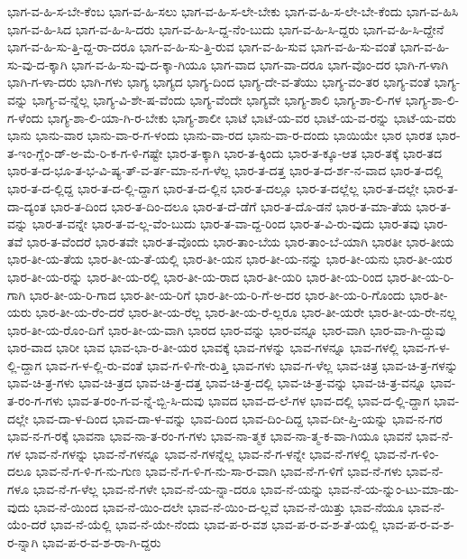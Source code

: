 {ಭಾಗ-ವ-ಹಿ-ಸ-ಬೇ-ಕೆಂಬ
ಭಾಗ-ವ-ಹಿ-ಸಲು
ಭಾಗ-ವ-ಹಿ-ಸ-ಲೇ-ಬೇಕು
ಭಾಗ-ವ-ಹಿ-ಸ-ಲೇ-ಬೇ-ಕೆಂದು
ಭಾಗ-ವ-ಹಿಸಿ
ಭಾಗ-ವ-ಹಿ-ಸಿದ
ಭಾಗ-ವ-ಹಿ-ಸಿ-ದರು
ಭಾಗ-ವ-ಹಿ-ಸಿ-ದ್ದ-ನೆಂ-ಬುದು
ಭಾಗ-ವ-ಹಿ-ಸಿ-ದ್ದರು
ಭಾಗ-ವ-ಹಿ-ಸಿ-ದ್ದೇನೆ
ಭಾಗ-ವ-ಹಿ-ಸು-ತ್ತಿ-ದ್ದ-ರಾ-ದರೂ
ಭಾಗ-ವ-ಹಿ-ಸು-ತ್ತಿ-ರುವ
ಭಾಗ-ವ-ಹಿ-ಸುವ
ಭಾಗ-ವ-ಹಿ-ಸು-ವಂತೆ
ಭಾಗ-ವ-ಹಿ-ಸು-ವು-ದ-ಕ್ಕಾಗಿ
ಭಾಗ-ವ-ಹಿ-ಸು-ವು-ದ-ಕ್ಕಾ-ಗಿಯೂ
ಭಾಗ-ವಾದ
ಭಾಗ-ವಾ-ದರೂ
ಭಾಗ-ವೊಂ-ದರ
ಭಾಗಿ-ಗ-ಳಾಗಿ
ಭಾಗಿ-ಗ-ಳಾ-ದರು
ಭಾಗಿ-ಗಳು
ಭಾಗ್ಯ
ಭಾಗ್ಯದ
ಭಾಗ್ಯ-ದಿಂದ
ಭಾಗ್ಯ-ದೇ-ವ-ತೆಯು
ಭಾಗ್ಯ-ವಂ-ತರ
ಭಾಗ್ಯ-ವಂತೆ
ಭಾಗ್ಯ-ವನ್ನು
ಭಾಗ್ಯ-ವ-ನ್ನೆಲ್ಲ
ಭಾಗ್ಯ-ವಿ-ಶೇ-ಷ-ವೆಂದು
ಭಾಗ್ಯ-ವೆಂದೇ
ಭಾಗ್ಯವೇ
ಭಾಗ್ಯ-ಶಾಲಿ
ಭಾಗ್ಯ-ಶಾ-ಲಿ-ಗಳ
ಭಾಗ್ಯ-ಶಾ-ಲಿ-ಗ-ಳೆಂದು
ಭಾಗ್ಯ-ಶಾ-ಲಿ-ಯಾ-ಗಿ-ರ-ಬೇಕು
ಭಾಗ್ಯ-ಶಾಲೀ
ಭಾಟೆ
ಭಾಟೆ-ಯ-ವರ
ಭಾಟೆ-ಯ-ವ-ರನ್ನು
ಭಾಟೆ-ಯ-ವರು
ಭಾನು
ಭಾನು-ವಾರ
ಭಾನು-ವಾ-ರ-ಗ-ಳಂದು
ಭಾನು-ವಾ-ರದ
ಭಾನು-ವಾ-ರ-ದಂದು
ಭಾಯಿಯೇ
ಭಾರ
ಭಾರತ
ಭಾರ-ತ-ಇಂ-ಗ್ಲೆಂ-ಡ್-ಅ-ಮೆ-ರಿ-ಕ-ಗ-ಳಿ-ಗಷ್ಟೇ
ಭಾರ-ತ-ಕ್ಕಾಗಿ
ಭಾರ-ತ-ಕ್ಕಿಂದು
ಭಾರ-ತ-ಕ್ಕೂ-ಆತ
ಭಾರ-ತಕ್ಕೆ
ಭಾರ-ತದ
ಭಾರ-ತ-ದ-ಭೂ-ತ-ಭ-ವಿ-ಷ್ಯ-ತ್-ವ-ರ್ತ-ಮಾ-ನ-ಗ-ಳೆಲ್ಲ
ಭಾರ-ತ-ದತ್ತ
ಭಾರ-ತ-ದ-ರ್ಶ-ನ-ವಾದ
ಭಾರ-ತ-ದಲ್ಲಿ
ಭಾರ-ತ-ದ-ಲ್ಲಿದ್ದ
ಭಾರ-ತ-ದ-ಲ್ಲಿ-ದ್ದಾಗ
ಭಾರ-ತ-ದ-ಲ್ಲಿನ
ಭಾರ-ತ-ದಲ್ಲೂ
ಭಾರ-ತ-ದಲ್ಲೆಲ್ಲ
ಭಾರ-ತ-ದಲ್ಲೇ
ಭಾರ-ತ-ದಾ-ದ್ಯಂತ
ಭಾರ-ತ-ದಿಂದ
ಭಾರ-ತ-ದಿಂ-ದಲೂ
ಭಾರ-ತ-ದೆ-ಡೆಗೆ
ಭಾರ-ತ-ದೊ-ಡನೆ
ಭಾರ-ತ-ಮಾ-ತೆಯ
ಭಾರ-ತ-ವನ್ನು
ಭಾರ-ತ-ವನ್ನೇ
ಭಾರ-ತ-ವ-ಲ್ಲ-ವೆಂ-ಬುದು
ಭಾರ-ತ-ವಾ-ದ್ದ-ರಿಂದ
ಭಾರ-ತ-ವಿ-ರು-ವುದು
ಭಾರ-ತವು
ಭಾರ-ತವೆ
ಭಾರ-ತ-ವೆಂದರೆ
ಭಾರ-ತವೇ
ಭಾರ-ತ-ವೊಂದು
ಭಾರ-ತಾಂ-ಬೆಯ
ಭಾರ-ತಾಂ-ಬೆ-ಯಾಗಿ
ಭಾರತೀ
ಭಾರ-ತೀಯ
ಭಾರ-ತೀ-ಯ-ತೆಯ
ಭಾರ-ತೀ-ಯ-ತೆ-ಯಲ್ಲಿ
ಭಾರ-ತೀ-ಯನ
ಭಾರ-ತೀ-ಯ-ನನ್ನು
ಭಾರ-ತೀ-ಯನು
ಭಾರ-ತೀ-ಯರ
ಭಾರ-ತೀ-ಯ-ರನ್ನು
ಭಾರ-ತೀ-ಯ-ರಲ್ಲಿ
ಭಾರ-ತೀ-ಯ-ರಾದ
ಭಾರ-ತೀ-ಯರಿ
ಭಾರ-ತೀ-ಯ-ರಿಂದ
ಭಾರ-ತೀ-ಯ-ರಿ-ಗಾಗಿ
ಭಾರ-ತೀ-ಯ-ರಿ-ಗಾದ
ಭಾರ-ತೀ-ಯ-ರಿಗೆ
ಭಾರ-ತೀ-ಯ-ರಿ-ಗೆ-ಅ-ದರ
ಭಾರ-ತೀ-ಯ-ರಿ-ಗೊಂದು
ಭಾರ-ತೀ-ಯರು
ಭಾರ-ತೀ-ಯ-ರೆಂ-ದರೆ
ಭಾರ-ತೀ-ಯ-ರೆಲ್ಲ
ಭಾರ-ತೀ-ಯ-ರೆ-ಲ್ಲರೂ
ಭಾರ-ತೀ-ಯರೇ
ಭಾರ-ತೀ-ಯ-ರೇ-ನಲ್ಲ
ಭಾರ-ತೀ-ಯ-ರೊಂ-ದಿಗೆ
ಭಾರ-ತೀ-ಯ-ವಾಗಿ
ಭಾರದ
ಭಾರ-ವನ್ನು
ಭಾರ-ವನ್ನೂ
ಭಾರ-ವಾಗಿ
ಭಾರ-ವಾ-ಗಿ-ದ್ದುವು
ಭಾರ-ವಾದ
ಭಾರೀ
ಭಾವ
ಭಾವ-ಭಾ-ರ-ತೀ-ಯರ
ಭಾವಕ್ಕೆ
ಭಾವ-ಗಳನ್ನು
ಭಾವ-ಗಳನ್ನೂ
ಭಾವ-ಗಳಲ್ಲಿ
ಭಾವ-ಗ-ಳ-ಲ್ಲಿ-ದ್ದಾಗ
ಭಾವ-ಗ-ಳ-ಲ್ಲಿ-ರು-ವಂತೆ
ಭಾವ-ಗ-ಳಿ-ಗೇ-ರುತ್ತಿ
ಭಾವ-ಗಳು
ಭಾವ-ಗ-ಳೆಲ್ಲ
ಭಾವ-ಚಿತ್ರ
ಭಾವ-ಚಿ-ತ್ರ-ಗಳನ್ನು
ಭಾವ-ಚಿ-ತ್ರ-ಗಳು
ಭಾವ-ಚಿ-ತ್ರದ
ಭಾವ-ಚಿ-ತ್ರ-ದತ್ತ
ಭಾವ-ಚಿ-ತ್ರ-ದಲ್ಲಿ
ಭಾವ-ಚಿ-ತ್ರ-ವನ್ನು
ಭಾವ-ಚಿ-ತ್ರ-ವನ್ನೂ
ಭಾವ-ತ-ರಂ-ಗ-ಗಳು
ಭಾವ-ತ-ರಂ-ಗ-ವ-ನ್ನೆ-ಬ್ಬಿ-ಸಿ-ದುವು
ಭಾವದ
ಭಾವ-ದ-ಲೆ-ಗಳ
ಭಾವ-ದಲ್ಲಿ
ಭಾವ-ದ-ಲ್ಲಿ-ದ್ದಾಗ
ಭಾವ-ದಲ್ಲೇ
ಭಾವ-ದಾ-ಳ-ದಿಂದ
ಭಾವ-ದಾ-ಳ-ವನ್ನು
ಭಾವ-ದಿಂದ
ಭಾವ-ದಿಂ-ದಿದ್ದ
ಭಾವ-ದೀ-ಪ್ತಿ-ಯನ್ನು
ಭಾವ-ನ-ಗರ
ಭಾವ-ನ-ಗ-ರಕ್ಕೆ
ಭಾವನಾ
ಭಾವ-ನಾ-ತ-ರಂ-ಗ-ಗಳು
ಭಾವ-ನಾ-ತ್ಮಕ
ಭಾವ-ನಾ-ತ್ಮ-ಕ-ವಾ-ಗಿಯೂ
ಭಾವನೆ
ಭಾವ-ನೆ-ಗಳ
ಭಾವ-ನೆ-ಗಳನ್ನು
ಭಾವ-ನೆ-ಗಳನ್ನೂ
ಭಾವ-ನೆ-ಗಳನ್ನೆಲ್ಲ
ಭಾವ-ನೆ-ಗ-ಳನ್ನೇ
ಭಾವ-ನೆ-ಗಳಲ್ಲಿ
ಭಾವ-ನೆ-ಗ-ಳಿಂ-ದಲೂ
ಭಾವ-ನೆ-ಗ-ಳಿ-ಗ-ನು-ಗುಣ
ಭಾವ-ನೆ-ಗ-ಳಿ-ಗ-ನು-ಸಾ-ರ-ವಾಗಿ
ಭಾವ-ನೆ-ಗ-ಳಿಗೆ
ಭಾವ-ನೆ-ಗಳು
ಭಾವ-ನೆ-ಗಳೂ
ಭಾವ-ನೆ-ಗ-ಳೆಲ್ಲ
ಭಾವ-ನೆ-ಗಳೇ
ಭಾವ-ನೆ-ಯ-ನ್ನಾ-ದರೂ
ಭಾವ-ನೆ-ಯನ್ನು
ಭಾವ-ನೆ-ಯ-ನ್ನುಂ-ಟು-ಮಾ-ಡು-ವುದು
ಭಾವ-ನೆ-ಯಿಂದ
ಭಾವ-ನೆ-ಯಿಂ-ದಲೇ
ಭಾವ-ನೆ-ಯಿಂ-ದ-ಲ್ಲವೆ
ಭಾವ-ನೆ-ಯಿತ್ತು
ಭಾವ-ನೆಯೂ
ಭಾವ-ನೆ-ಯೆಂ-ದರೆ
ಭಾವ-ನೆ-ಯೆಲ್ಲಿ
ಭಾವ-ನೆ-ಯೇ-ನೆಂದು
ಭಾವ-ಪ-ರ-ವಶ
ಭಾವ-ಪ-ರ-ವ-ಶ-ತೆ-ಯಲ್ಲಿ
ಭಾವ-ಪ-ರ-ವ-ಶ-ರ-ನ್ನಾಗಿ
ಭಾವ-ಪ-ರ-ವ-ಶ-ರಾ-ಗಿ-ದ್ದರು
}
